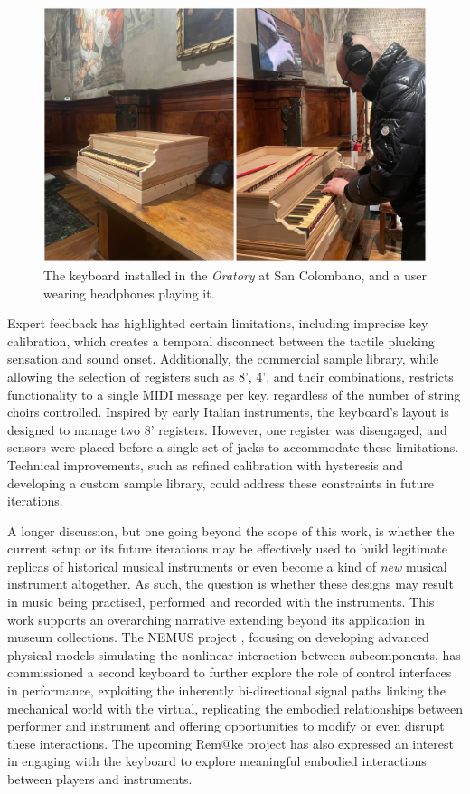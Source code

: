 \begin{figure}
\centering
\includegraphics[width = \linewidth]{src/images/keyboardMuseum.JPEG}
\caption{The keyboard installed in the \emph{Oratory} at San Colombano, and a user wearing headphones playing it.}\label{fig:oratory}
\end{figure}

Expert feedback has highlighted certain limitations, including imprecise key calibration, which creates a temporal disconnect between the tactile plucking sensation and sound onset. Additionally, the commercial sample library, while allowing the selection of registers such as 8', 4', and their combinations, restricts functionality to a single MIDI message per key, regardless of the number of string choirs controlled. Inspired by early Italian instruments, the keyboard's layout is designed to manage two 8' registers. However, one register was disengaged, and sensors were placed before a single set of jacks to accommodate these limitations. Technical improvements, such as refined calibration with hysteresis and developing a custom sample library, could address these constraints in future iterations.

A longer discussion, but one going beyond the scope of this work, is whether the current setup or its future iterations may be effectively used to build legitimate replicas of historical musical instruments or even become a kind of \emph{new} musical instrument altogether. As such, the question is whether these designs may result in music being practised, performed and recorded with the instruments. This work supports an overarching narrative extending beyond its application in museum collections. The NEMUS project \cite{NEMUS}, focusing on developing advanced physical models simulating the nonlinear interaction between subcomponents, has commissioned a second keyboard to further explore the role of control interfaces in performance, exploiting the inherently bi-directional signal paths linking the mechanical world with the virtual, replicating the embodied relationships between performer and instrument and offering opportunities to modify or even disrupt these interactions. The upcoming Rem@ke project \cite{remake1} has also expressed an interest in engaging with the keyboard to explore meaningful embodied interactions between players and instruments. 


